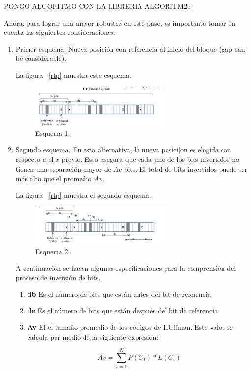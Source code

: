 PONGO ALGORITMO CON LA LIBRERIA ALGORITM2e

Ahora, para lograr una mayor robustez en este paso, es importante tomar en cuenta las siguientes consideraciones:

\begin{enumerate}
\item Primer esquema. Nueva posición con referencia al inicio del bloque (gap can be considerable).

La figura ~\ref{rtp} muestra este esquema.

\begin{figure}[H]
\centering
\includegraphics[width=7cm]{logos/es1.png}
\caption{Esquema 1.}
\label{eee1}
\end{figure}



\item Segundo esquema. En esta alternativa, la nueva posici[on es elegida con respecto a el $x$ previo. Esto asegura que cada uno de los bits invertidos no tienen una separación mayor de $Av$ bits. El total de bits invertidos puede ser más alto que el promedio $Av$.


La figura ~\ref{rtp} muestra el segundo esquema.

\begin{figure}[H]
\centering
\includegraphics[width=7cm]{logos/es2.png}
\caption{Esquema 2.}
\label{eee2}
\end{figure}

A continuación se hacen algunas especificaciones para la comprensión del proceso de inversión de bits.

\begin{enumerate}
\item \textbf{db} Es el número de bits que están antes del bit de referencia.
\item \textbf{de} Es el número de bits que están después del bit de referencia.
\item \textbf{Av} El el tamaño promedio de los códigos de HUffman. Este valor se calcula por medio de la siguiente expresión:


\begin{equation}
Av = \sum_{i=1}^{N} P(C_{I})* L(C_{i}) 
\end{equation}


\end{enumerate}



\end{enumerate}



